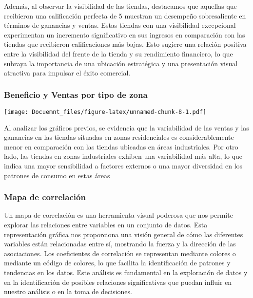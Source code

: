 \documentclass[
]{article}
\begin{document}
Además, al observar la visibilidad de las tiendas, destacamos que
aquellas que recibieron una calificación perfecta de 5 muestran un
desempeño sobresaliente en términos de ganancias y ventas. Estas tiendas
con una visibilidad excepcional experimentan un incremento significativo
en sus ingresos en comparación con las tiendas que recibieron
calificaciones más bajas. Esto sugiere una relación positiva entre la
visibilidad del frente de la tienda y su rendimiento financiero, lo que
subraya la importancia de una ubicación estratégica y una presentación
visual atractiva para impulsar el éxito comercial.

\hypertarget{beneficio-y-ventas-por-tipo-de-zona}{%
\subsubsection{Beneficio y Ventas por tipo de
zona}\label{beneficio-y-ventas-por-tipo-de-zona}}

\texttt{[image: Docuemnt\_files/figure-latex/unnamed-chunk-8-1.pdf]}

Al analizar los gráficos previos, se evidencia que la variabilidad de
las ventas y las ganancias en las tiendas situadas en zonas
residenciales es considerablemente menor en comparación con las tiendas
ubicadas en áreas industriales. Por otro lado, las tiendas en zonas
industriales exhiben una variabilidad más alta, lo que indica una mayor
sensibilidad a factores externos o una mayor diversidad en los patrones
de consumo en estas áreas

\hypertarget{mapa-de-correlaciuxf3n}{%
\subsubsection{Mapa de correlación}\label{mapa-de-correlaciuxf3n}}

Un mapa de correlación es una herramienta visual poderosa que nos
permite explorar las relaciones entre variables en un conjunto de datos.
Esta representación gráfica nos proporciona una visión general de cómo
las diferentes variables están relacionadas entre sí, mostrando la
fuerza y la dirección de las asociaciones. Los coeficientes de
correlación se representan mediante colores o mediante un código de
colores, lo que facilita la identificación de patrones y tendencias en
los datos. Este análisis es fundamental en la exploración de datos y en
la identificación de posibles relaciones significativas que puedan
influir en nuestro análisis o en la toma de decisiones.
\end{document}
